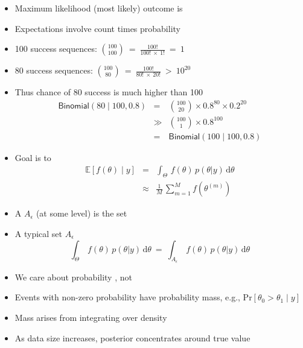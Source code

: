 \documentclass[10pt]{report}
\begin{document}
%
\begin{itemize}
\item Maximum likelihood (most likely) outcome is 
\item Expectations involve count times probability
\item 100 success sequences:
$\binom{100}{100} \ = \ \frac{100!}{100! \ \times \ 1!} \ = \ 1$
\item 80 success sequences:
$\binom{100}{80} \ = \ \frac{100!}{80! \ \times \ 20!} \ > \ 10^{20}$
\item Thus chance of 80 success is much higher than 100
\begin{eqnarray*}
\mathsf{Binomial}(80 \mid 100, 0.8)
& = &
  \textstyle \binom{100}{20} \times 0.8^{80} \times 0.2^{20}
\\[4pt]
& \gg &
\textstyle \binom{100}{1} \times 0.8^{100}
\\[4pt]
& = &
\mathsf{Binomial}(100 \mid 100, 0.8)
\end{eqnarray*}
\end{itemize}


%
\begin{itemize}
\item Goal is to 
\begin{eqnarray*}
\mathbb{E}\left[ f(\theta) \mid y \right]
& = & \int_{\Theta} \, f(\theta) \, p(\theta | y) \, \mathrm{d}\theta
\\[4pt]
& \approx & \frac{1}{M} \, \sum_{m=1}^M f(\theta^{(m)})
\end{eqnarray*}
\item A  $A_{\epsilon}$ (at some level) is the set
\item A typical set $A_{\epsilon}$ 
\[
\int_{\Theta} \, f(\theta) \, p(\theta | y) \, \mathrm{d}\theta
\ = \
\int_{A_{\epsilon}} \, f(\theta) \, p(\theta | y) \, \mathrm{d}\theta
\]
\end{itemize}




%
\begin{itemize}
\item We care about probability , not 
\item Events with non-zero probability have probability mass, e.g.,
  $\mbox{Pr}[\theta_0 > \theta_1 \mid y]$
\item Mass arises from integrating over density
\item As data size increases, posterior concentrates around true value
\end{itemize}
\end{document}
